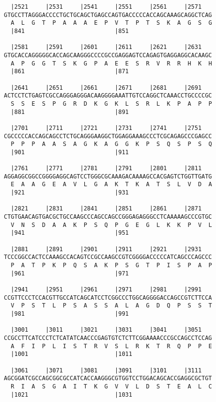 \documentclass{article}
\begin{document}
\begin{Verbatim}
  |2521     |2531     |2541     |2551     |2561     |2571   
GTGCCTTAGGGACCCCTGCTGCAGCTGAGCCAGTGACCCCCACCAGCAAAGCAGGCTCAG
  A  L  G  T  P  A  A  A  E  P  V  T  P  T  S  K  A  G  S  G
  |841                          |851                        
  
  |2581     |2591     |2601     |2611     |2621     |2631   
GTGCACCAGGGGGCACCAGCAAGGGCCCCGCCGAGGAGTCCAGAGTGAGGAGGCACAAGC
  A  P  G  G  T  S  K  G  P  A  E  E  S  R  V  R  R  H  K  H
  |861                          |871                        
  
  |2641     |2651     |2661     |2671     |2681     |2691   
ACTCCTCTGAGTCGCCAGGGAGGGACAAGGGGAAATTGTCCAGGCTCAAACCTGCCCCGC
  S  S  E  S  P  G  R  D  K  G  K  L  S  R  L  K  P  A  P  P
  |881                          |891                        
  
  |2701     |2711     |2721     |2731     |2741     |2751   
CGCCCCCACCAGCAGCCTCTGCAGGGAAGGCTGGAGGAAAGCCCTCGCAGAGCCCGAGCC
  P  P  P  A  A  S  A  G  K  A  G  G  K  P  S  Q  S  P  S  Q
  |901                          |911                        
  
  |2761     |2771     |2781     |2791     |2801     |2811   
AGGAGGCGGCCGGGGAGGCAGTCCTGGGCGCAAAGACAAAAGCCACGAGTCTGGTTGATG
  E  A  A  G  E  A  V  L  G  A  K  T  K  A  T  S  L  V  D  A
  |921                          |931                        
  
  |2821     |2831     |2841     |2851     |2861     |2871   
CTGTGAACAGTGACGCTGCCAAGCCCAGCCAGCCGGGAGAGGGCCTCAAAAAGCCCGTGC
  V  N  S  D  A  A  K  P  S  Q  P  G  E  G  L  K  K  P  V  L
  |941                          |951                        
  
  |2881     |2891     |2901     |2911     |2921     |2931   
TCCCGGCCACTCCAAAGCCACAGTCCGCCAAGCCGTCGGGGACCCCCATCAGCCCAGCCC
  P  A  T  P  K  P  Q  S  A  K  P  S  G  T  P  I  S  P  A  P
  |961                          |971                        
  
  |2941     |2951     |2961     |2971     |2981     |2991   
CCGTTCCCTCCACGTTGCCATCAGCATCCTCGGCCCTGGCAGGGGACCAGCCGTCTTCCA
  V  P  S  T  L  P  S  A  S  S  A  L  A  G  D  Q  P  S  S  T
  |981                          |991                        
  
  |3001     |3011     |3021     |3031     |3041     |3051   
CCGCCTTCATCCCTCTCATATCAACCCGAGTGTCTCTTCGGAAAACCCGCCAGCCTCCAG
  A  F  I  P  L  I  S  T  R  V  S  L  R  K  T  R  Q  P  P  E
  |1001                         |1011                       
  
  |3061     |3071     |3081     |3091     |3101     |3111   
AGCGGATCGCCAGCGGCGCCATCACCAAGGGCGTGGTCCTGGACAGCACCGAGGCGCTGT
  R  I  A  S  G  A  I  T  K  G  V  V  L  D  S  T  E  A  L  C
  |1021                         |1031                       
  

\end{Verbatim}
\end{document}
